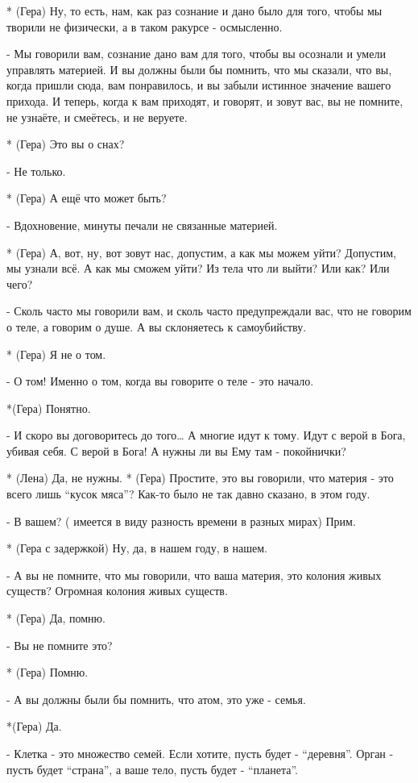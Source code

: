 * (Гера) Ну, то есть, нам, как раз сознание и дано было для того, чтобы мы творили не физически, а в таком ракурсе - осмысленно.

- Мы говорили вам, сознание дано вам для того, чтобы вы осознали и умели управлять материей. И вы должны были бы помнить, что мы сказали, что вы, когда пришли сюда, вам понравилось, и вы забыли истинное значение вашего прихода. И теперь, когда к вам приходят, и говорят, и зовут вас, вы не помните, не узнаёте, и смеётесь, и не веруете.

* (Гера) Это вы о снах?

- Не только.

* (Гера) А ещё что может быть?

- Вдохновение, минуты печали не связанные материей.

* (Гера)  А, вот, ну, вот зовут нас, допустим, а как мы можем уйти? Допустим, мы узнали всё. А как мы сможем уйти? Из тела что ли выйти? Или как? Или чего?

- Сколь часто мы говорили вам, и сколь часто предупреждали вас, что не говорим о теле, а говорим о душе. А вы склоняетесь к самоубийству.

* (Гера) Я не о том.

- О том! Именно о том, когда вы говорите о теле - это начало. 

*(Гера) Понятно.

- И скоро вы договоритесь до того… А многие идут к тому.  Идут с верой в Бога, убивая себя. С верой в Бога! А нужны ли вы Ему там - покойнички?

* (Лена) Да, не нужны.
* (Гера) Простите, это вы говорили, что материя - это всего лишь “кусок мяса”? Как-то было не так давно сказано, в этом году.

- В вашем? ( имеется в виду разность времени в разных мирах) Прим.

* (Гера с задержкой) Ну, да, в нашем году, в нашем.

- А вы не помните, что мы говорили, что ваша материя, это колония живых существ? Огромная колония живых существ. 

* (Гера) Да, помню.

- Вы не помните это?

* (Гера) Помню.

- А вы должны были бы помнить, что атом, это уже - семья.  

*(Гера) Да.

- Клетка - это множество семей. Если хотите, пусть будет - “деревня”. Орган - пусть будет “страна”, а ваше тело, пусть будет - “планета”.


